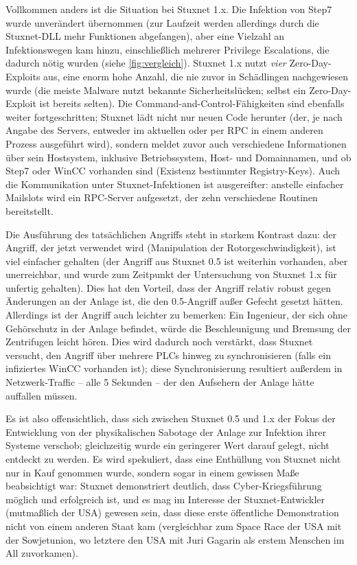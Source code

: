 \documentclass[a4paper]{article}
\begin{document}
Vollkommen anders ist die Situation bei Stuxnet 1.x.
Die Infektion von Step7 wurde unverändert übernommen (zur Laufzeit werden allerdings durch die Stuxnet-DLL mehr Funktionen abgefangen),
aber eine Vielzahl an Infektionswegen kam hinzu, einschließlich mehrerer Privilege Escalations, die dadurch nötig wurden (siehe \autoref{fig:vergleich}).
Stuxnet 1.x nutzt \emph{vier} Zero-Day-Exploits aus, eine enorm hohe Anzahl, die nie zuvor in Schädlingen nachgewiesen wurde
(die meiste Malware nutzt bekannte Sicherheitslücken; selbst ein Zero-Day-Exploit ist bereits selten).
Die Command-and-Control-Fähigkeiten sind ebenfalls weiter fortgeschritten;
Stuxnet lädt nicht nur neuen Code herunter (der, je nach Angabe des Servers, entweder im aktuellen oder per RPC in einem anderen Prozess ausgeführt wird),
sondern meldet zuvor auch verschiedene Informationen über sein Hostsystem,
inklusive Betriebssystem, Host- und Domainnamen, und ob Step7 oder WinCC vorhanden sind (Existenz bestimmter Registry-Keys).
Auch die Kommunikation unter Stuxnet-Infektionen ist ausgereifter:
anstelle einfacher Mailslots wird ein RPC-Server aufgesetzt, der zehn verschiedene Routinen bereitstellt. %

Die Ausführung des tatsächlichen Angriffs steht in starkem Kontrast dazu:
der Angriff, der jetzt verwendet wird (Manipulation der Rotorgeschwindigkeit),
ist viel einfacher gehalten (der Angriff aus Stuxnet 0.5 ist weiterhin vorhanden, aber unerreichbar, und wurde zum Zeitpunkt der Untersuchung von Stuxnet 1.x für unfertig gehalten\cite{dossier}).
Dies hat den Vorteil, dass der Angriff relativ robust gegen Änderungen an der Anlage ist, die den 0.5-Angriff außer Gefecht gesetzt hätten.
Allerdings ist der Angriff auch leichter zu bemerken:
Ein Ingenieur, der sich ohne Gehörschutz in der Anlage befindet, würde die Beschleunigung und Bremsung der Zentrifugen leicht hören.
Dies wird dadurch noch verstärkt, dass Stuxnet versucht, den Angriff über mehrere PLCs hinweg zu synchronisieren
(falls ein infiziertes WinCC vorhanden ist);
diese Synchronisierung resultiert außerdem in Netzwerk-Traffic – alle 5 Sekunden – der den Aufsehern der Anlage hätte auffallen müssen.

Es ist also offensichtlich, dass sich zwischen Stuxnet 0.5 und 1.x der Fokus der Entwicklung
von der physikalischen Sabotage der Anlage zur Infektion ihrer Systeme verschob;
gleichzeitig wurde ein geringerer Wert darauf gelegt, nicht entdeckt zu werden.
Es wird spekuliert, dass eine Enthüllung von Stuxnet nicht nur in Kauf genommen wurde,
sondern sogar in einem gewissen Maße beabsichtigt war:
Stuxnet demonstriert deutlich, dass Cyber-Kriegsführung möglich und erfolgreich ist,
und es mag im Interesse der Stuxnet-Entwickler (mutmaßlich der USA) gewesen sein,
dass diese erste öffentliche Demonstration nicht von einem anderen Staat kam
(vergleichbar zum Space Race der USA mit der Sowjetunion,
wo letztere den USA mit Juri Gagarin als erstem Menschen im All zuvorkamen). %



\end{document}
